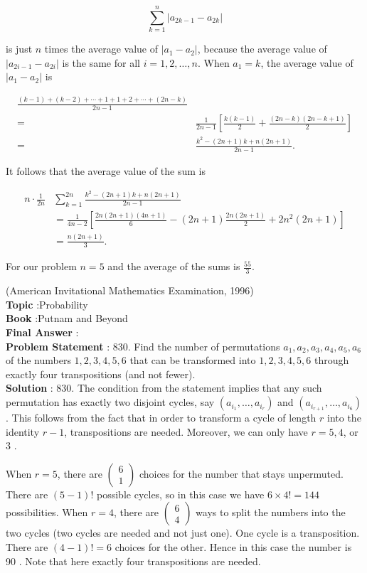 \documentclass[10pt]{article}
\begin{document}
$$
\sum_{k=1}^{n}\left|a_{2 k-1}-a_{2 k}\right|
$$

is just $n$ times the average value of $\left|a_{1}-a_{2}\right|$, because the average value of $\left|a_{2 i-1}-a_{2 i}\right|$ is the same for all $i=1,2, \ldots, n$. When $a_{1}=k$, the average value of $\left|a_{1}-a_{2}\right|$ is

$$
\begin{aligned}
\frac{(k-1)+(k-2)+\cdots+1+1+2+\cdots+(2 n-k)}{2 n-1} \\
=& \frac{1}{2 n-1}\left[\frac{k(k-1)}{2}+\frac{(2 n-k)(2 n-k+1)}{2}\right] \\
=& \frac{k^{2}-(2 n+1) k+n(2 n+1)}{2 n-1} .
\end{aligned}
$$

It follows that the average value of the sum is

$$
\begin{aligned}
n \cdot \frac{1}{2 n} & \sum_{k=1}^{2 n} \frac{k^{2}-(2 n+1) k+n(2 n+1)}{2 n-1} \\
&=\frac{1}{4 n-2}\left[\frac{2 n(2 n+1)(4 n+1)}{6}-(2 n+1) \frac{2 n(2 n+1)}{2}+2 n^{2}(2 n+1)\right] \\
&=\frac{n(2 n+1)}{3} .
\end{aligned}
$$

For our problem $n=5$ and the average of the sums is $\frac{55}{3}$.

(American Invitational Mathematics Examination, 1996)
\\
\textbf{Topic} :Probability\\
\textbf{Book} :Putnam and Beyond\\
\textbf{Final Answer} :\\


\textbf{Problem Statement} :
830. Find the number of permutations $a_{1}, a_{2}, a_{3}, a_{4}, a_{5}, a_{6}$ of the numbers $1,2,3,4,5,6$ that can be transformed into $1,2,3,4,5,6$ through exactly four transpositions (and not fewer).
\\
\textbf{Solution} :
830. The condition from the statement implies that any such permutation has exactly two disjoint cycles, say $\left(a_{i_{1}}, \ldots, a_{i_{r}}\right)$ and $\left(a_{i_{r+1}}, \ldots, a_{i_{6}}\right)$. This follows from the fact that in order to transform a cycle of length $r$ into the identity $r-1$, transpositions are needed. Moreover, we can only have $r=5,4$, or 3 .

When $r=5$, there are $\left(\begin{array}{l}6 \\ 1\end{array}\right)$ choices for the number that stays unpermuted. There are $(5-1) !$ possible cycles, so in this case we have $6 \times 4 !=144$ possibilities. When $r=4$, there are $\left(\begin{array}{l}6 \\ 4\end{array}\right)$ ways to split the numbers into the two cycles (two cycles are needed and not just one). One cycle is a transposition. There are $(4-1) !=6$ choices for the other. Hence in this case the number is 90 . Note that here exactly four transpositions are needed.
\end{document}

